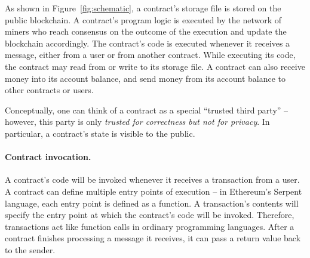 \documentclass[10pt,twocolumn,letterpaper]{article}
\begin{document}
As shown in Figure~\ref{fig:schematic}, a contract's storage file is stored on the public blockchain.
A contract's program logic is executed by the network of miners 
who reach consensus on the outcome of the execution  
and update the blockchain accordingly.
The contract's code is executed whenever it receives a message, 
either from a user or from another contract.
While executing its code, the contract may read from or write to its storage file.
A contract can also receive money into its account balance, and send money from its account balance to other contracts or users.




Conceptually, one can think of a contract as 
a special ``trusted third party'' -- however,
this party is only {\it trusted for correctness but not for privacy}.
In particular, a contract's state is 
visible to the public.

\paragraph{Contract invocation.} 
A contract's code will be invoked 
whenever it receives a transaction from a user.
A contract can define multiple entry points
of execution -- in Ethereum's Serpent language,
each entry point is defined as a function.
A transaction's contents
will specify the entry point 
at which the contract's code will be invoked.
Therefore, transactions act like function calls in ordinary programming languages. 
After a contract finishes processing a message it receives, it can pass a return value back to the sender.
\end{document}
